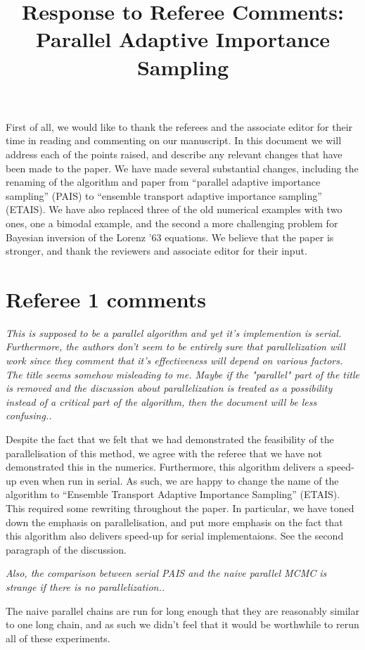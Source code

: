 \documentclass{article}
\newcommand{\comment}[2]{\vspace{0.6cm}{\bf Comment:} {\it #1.}

\vspace{0.3cm}{\bf Answer:} #2}
\begin{document}
\title{Response to Referee Comments: Parallel Adaptive Importance Sampling}
\maketitle
First of all, we would like to thank the referees and the associate editor for
their time in reading and commenting on our manuscript. In this document
we will address each of the points raised, and describe any relevant
changes that have been made to the paper. We have made several substantial changes, including the renaming of the algorithm and paper from ``parallel adaptive importance sampling'' (PAIS) to ``ensemble transport adaptive importance sampling'' (ETAIS). We have also replaced three of the old numerical examples with two ones, one a bimodal example, and the second a more challenging problem for Bayesian inversion of the Lorenz '63 equations. We believe that the paper is stronger, and thank the reviewers and associate editor for their input.

\section*{Referee 1 comments}

\comment{This is supposed to be a parallel algorithm and yet it's implemention is serial. Furthermore, the authors don't seem to be entirely sure that parallelization will work since they comment that it's effectiveness will depend on various factors. The title seems somehow misleading to me. Maybe if the "parallel" part of the title is removed and the discussion about parallelization is treated as a possibility instead of a critical part of the algorithm, then the document will be less confusing.}{Despite the fact that we felt that we had demonstrated the feasibility of the parallelisation of this method, we agree with the referee that we have not demonstrated this in the numerics. Furthermore, this algorithm delivers a speed-up even when run in serial. As such, we are happy to change the name of the algorithm to ``Ensemble Transport Adaptive Importance Sampling'' (ETAIS). This required some rewriting throughout the paper. In particular, we have toned down the emphasis on parallelisation, and put more emphasis on the fact that this algorithm also delivers speed-up for serial implementaions. See the second paragraph of the discussion.}

\comment{Also, the comparison between serial PAIS and the naive parallel MCMC is strange if there is no parallelization.}{The naive parallel chains are run for long enough that they are reasonably similar to one long chain, and as such we didn't feel that it would be worthwhile to rerun all of these experiments.}
\end{document}
